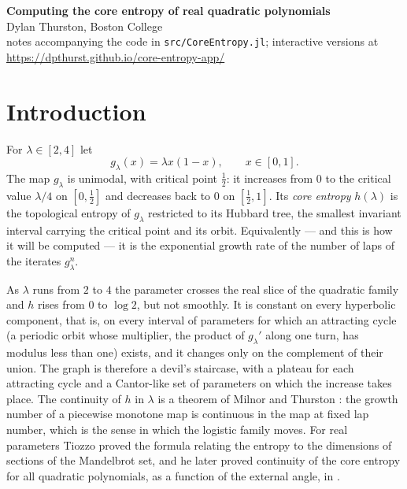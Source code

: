 \documentclass[11pt]{article}
\theoremstyle{plain}
\theoremstyle{definition}
\begin{document}
\begin{center}
  {\Large\bfseries Computing the core entropy of real quadratic polynomials}\\[3pt]
  {\small Dylan Thurston, Boston College}\\[2pt]
  {\small notes accompanying the code in \texttt{src/CoreEntropy.jl};
   interactive versions at \url{https://dpthurst.github.io/core-entropy-app/}}
\end{center}
\vspace{2pt}

\section{Introduction}

For $\lambda\in[2,4]$ let
\begin{equation}\label{eq:g}
  g_\lambda(x)=\lambda x(1-x),\qquad x\in[0,1].
\end{equation}
The map $g_\lambda$ is unimodal, with critical point $\tfrac12$: it increases from $0$ to the
critical value $\lambda/4$ on $[0,\tfrac12]$ and decreases back to $0$ on $[\tfrac12,1]$.
Its \emph{core entropy}
$h(\lambda)$ is the topological entropy of $g_\lambda$ restricted to its Hubbard tree, the
smallest invariant interval carrying the critical point and its orbit.  Equivalently ---
and this is how it will be computed --- it is the exponential growth rate of the number of
laps of the iterates $g_\lambda^n$.

As $\lambda$ runs from $2$ to $4$ the parameter crosses the real slice of the quadratic
family and $h$ rises from $0$ to $\log2$, but not smoothly.  It is constant on every
hyperbolic component, that is, on every interval of parameters for which an attracting
cycle (a periodic orbit whose multiplier, the product of $g_\lambda'$ along one turn, has
modulus less than one) exists, and it changes
only on the complement of their union.  The graph is
therefore a devil's staircase, with a plateau for each attracting cycle and a Cantor-like
set of parameters on which the increase takes place.  The continuity of $h$ in $\lambda$ is
a theorem of Milnor and Thurston \cite[Lemma 12.3]{MT}: the growth number of a piecewise
monotone map is continuous in the map at fixed lap number, which is the sense in which the
logistic family moves.  For real parameters Tiozzo \cite{Tiozzo} proved the formula relating
the entropy to the dimensions of sections of the Mandelbrot set, and he later proved
continuity of the core entropy for all quadratic polynomials, as a function of the external
angle, in \cite{Tiozzo2}.
\end{document}
